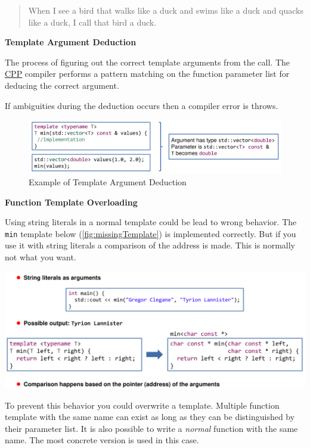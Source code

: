 \documentclass[11pt,twoside,landscape]{article}
\begin{document}
\begin{multicols}{3}
\begin{quote}
When I see a bird that walks like a duck and swims like a duck and quacks like a duck, I call that bird a duck.
\end{quote}

\textbf{Template Argument Deduction}

The process of figuring out the correct template arguments from the call.
The \href{../../../roam/20210920103243-c.org}{CPP} compiler performs a pattern matching on the function parameter list for deducing the correct argument.

If ambiguities during the deduction occurs then a compiler error is throws.


{
\begin{figure}[htbp]
\centering
\includegraphics[width=.9\linewidth]{img/template_argument_deduction.png}
\caption{Example of Template Argument Deduction}
\end{figure}
}

\textbf{Function Template Overloading}

Using string literals in a normal template could be lead to wrong behavior.
The \texttt{min} template below (\ref{fig:missingTemplate}) is implemented correctly.
But if you use it with string literals a comparison of the address is made.
This is normally not what you want.

{
\begin{center}
\includegraphics[width=.9\linewidth]{img/missing_template_overloadin.png}
\end{center}
\label{fig:missingTemplate}
}


To prevent this behavior you could overwrite a template.
Multiple function template with the same name can exist as long as they can be distinguished by their parameter list.
It is also possible to write a \emph{normal} function with the same name.
The most concrete version is used in this case.


\end{multicols}
\end{document}
